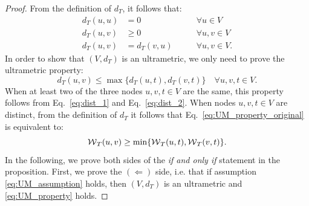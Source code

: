 \begin{proof}

From the definition of $d_{T}$, it follows that:
\begin{align}
d_{T}(u,u) &= 0 \qquad &\forall u\in V \label{eq:dist_1} \\ 
d_{T}(u,v) &\geq 0 \qquad &\forall u,v \in V \label{eq:dist_2}\\
d_{T}(u,v)& =d_{T}(v,u) \qquad &\forall u,v \in V. \label{eq:dist_3}
\end{align}
In order to show that $(V, d_{T})$ is an ultrametric, we only need to prove the ultrametric property:
\begin{equation}\label{eq:UM_property_original}
d_T(u,v) \leq \max \{d_T(u,t), d_T(v,t)\} \quad \forall u,v,t \in V.
\end{equation}
When at least two of the three nodes $u,v,t \in V$ are the same, this property follows from Eq.~\ref{eq:dist_1} and Eq.~\ref{eq:dist_2}. When nodes $u,v,t\in V$ are distinct, from the definition of $d_{T}$ it follows that Eq.~\ref{eq:UM_property_original} is equivalent to:
\begin{equation}\label{eq:UM_property}
\mathcal{W}{}_{T}(u,v) \geq \min \{\mathcal{W}{}_{T}(u,t), \mathcal{W}{}_{T}(v,t)\}.
\end{equation}
In the following, we prove both sides of the \emph{if and only if} statement in the proposition. First, we prove the $(\Leftarrow)$ side, i.e. that if assumption \ref{eq:UM_assumption} holds, then $(V, d_{T})$ is an ultrametric and \ref{eq:UM_property} holds. 


\end{proof}

